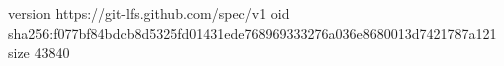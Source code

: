 version https://git-lfs.github.com/spec/v1
oid sha256:f077bf84bdcb8d5325fd01431ede768969333276a036e8680013d7421787a121
size 43840
